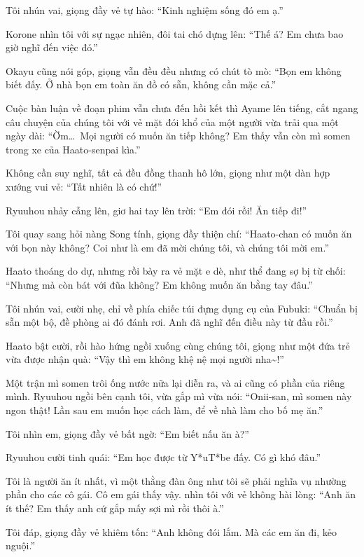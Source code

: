 \documentclass[../main.tex]{subfiles}
\begin{document}
Tôi nhún vai, giọng đầy vẻ tự hào: ``Kinh nghiệm sống đó em ạ.''

Korone nhìn tôi với sự ngạc nhiên, đôi tai chó dựng lên: ``Thế á? Em chưa bao giờ nghĩ đến việc đó.''

Okayu cũng nói góp, giọng vẫn đều đều nhưng có chút tò mò: ``Bọn em không biết đấy. Ở nhà bọn em toàn ăn đồ có sẵn, không cần mặc cả.''

Cuộc bàn luận về đoạn phim vẫn chưa đến hồi kết thì Ayame lên tiếng, cắt ngang câu chuyện của chúng tôi với vẻ mặt đói khổ của một người vừa trải qua một ngày dài: ``Ờm\dots\ Mọi người có muốn ăn tiếp không? Em thấy vẫn còn mì somen trong xe của Haato-senpai kìa.''

Không cần suy nghĩ, tất cả đều đồng thanh hô lớn, giọng như một dàn hợp xướng vui vẻ: ``Tất nhiên là có chứ!''

Ryuuhou nhảy cẫng lên, giơ hai tay lên trời: ``Em đói rồi! Ăn tiếp đi!''

Tôi quay sang hỏi nàng Song tính, giọng đầy thiện chí: ``Haato-chan có muốn ăn với bọn này không? Coi như là em đã mời chúng tôi, và chúng tôi mời em.''

Haato thoáng do dự, nhưng rồi bày ra vẻ mặt e dè, như thể đang sợ bị từ chối: ``Nhưng mà còn bát với đũa không? Em không muốn ăn bằng tay đâu.''

Tôi nhún vai, cười nhẹ, chỉ về phía chiếc túi đựng dụng cụ của Fubuki: ``Chuẩn bị sẵn một bộ, đề phòng ai đó đánh rơi. Anh đã nghĩ đến điều này từ đầu rồi.''

Haato bật cười, rồi hào hứng ngồi xuống cùng chúng tôi, giọng như một đứa trẻ vừa được nhận quà: ``Vậy thì em không khệ nệ mọi người nha\~{}!''

Một trận mì somen trôi ống nước nữa lại diễn ra, và ai cũng có phần của riêng mình. Ryuuhou ngồi bên cạnh tôi, vừa gắp mì vừa nói: ``Onii-san, mì somen này ngon thật! Lần sau em muốn học cách làm, để về nhà làm cho bố mẹ ăn.''

Tôi nhìn em, giọng đầy vẻ bất ngờ: ``Em biết nấu ăn à?''

Ryuuhou cười tinh quái: ``Em học được từ Y*uT*be đấy. Có gì khó đâu.''

Tôi là người ăn ít nhất, vì một thằng đàn ông như tôi sẽ phải nghĩa vụ nhường phần cho các cô gái. Cô em gái thấy vậy. nhìn tôi với vẻ không hài lòng: ``Anh ăn ít thế? Em thấy anh cứ gắp mấy sợi mì rồi thôi à.''

Tôi đáp, giọng đầy vẻ khiêm tốn: ``Anh không đói lắm. Mà các em ăn đi, kẻo nguội.''
\end{document}
